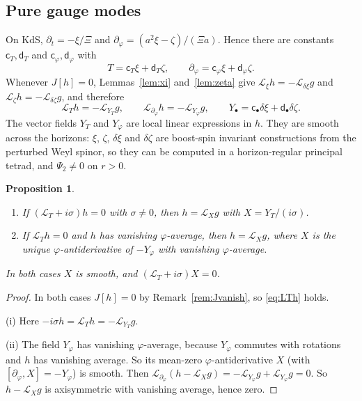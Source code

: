 \documentclass[11pt]{amsart}
\newtheorem{proposition}[theorem]{Proposition}
\theoremstyle{definition}
\theoremstyle{remark}
\numberwithin{equation}{section}
\newcommand{\cL}{\mathcal{L}}
\begin{document}
\subsection{Pure gauge modes}
On KdS, $\partial_t=-\xi/\Xi$ and $\partial_\varphi=(a^2\xi-\zeta)/(\Xi a)$. Hence there are constants $\mathsf c_T,\mathsf d_T$
and $\mathsf c_\varphi,\mathsf d_\varphi$ with
\[
T=\mathsf c_T\xi+\mathsf d_T\zeta,\qquad \partial_\varphi=\mathsf c_\varphi\xi+\mathsf d_\varphi\zeta.
\]
Whenever $J[h]=0$, Lemmas~\ref{lem:xi} and~\ref{lem:zeta} give $\cL_\xi h=-\cL_{\delta\xi}g$ and
$\cL_\zeta h=-\cL_{\delta\zeta}g$, and therefore
\begin{equation}\label{eq:LTh}
\cL_Th=-\cL_{Y_T}g,\qquad \cL_{\partial_\varphi}h=-\cL_{Y_\varphi}g,\qquad
Y_\bullet=\mathsf c_\bullet\delta\xi+\mathsf d_\bullet\delta\zeta.
\end{equation}
The vector fields $Y_T$ and $Y_\varphi$ are local linear expressions in $h$. They are smooth across the horizons:
$\xi$, $\zeta$, $\delta\xi$ and $\delta\zeta$ are boost-spin invariant constructions from the perturbed Weyl spinor,
so they can be computed in a horizon-regular principal tetrad, and $\Psi_2\ne0$ on $r>0$.

\begin{proposition}\label{prop:puregauge}
\begin{enumerate}[label=(\roman*)]
\item If $(\cL_T+i\sigma)h=0$ with $\sigma\ne0$, then $h=\cL_Xg$ with $X=Y_T/(i\sigma)$.
\item If $\cL_Th=0$ and $h$ has vanishing $\varphi$-average, then $h=\cL_Xg$, where $X$ is the unique
$\varphi$-antiderivative of $-Y_\varphi$ with vanishing $\varphi$-average.
\end{enumerate}
In both cases $X$ is smooth, and $(\cL_T+i\sigma)X=0$.
\end{proposition}

\begin{proof}
In both cases $J[h]=0$ by Remark~\ref{rem:Jvanish}, so \eqref{eq:LTh} holds.

(i) Here $-i\sigma h=\cL_Th=-\cL_{Y_T}g$.

(ii) The field $Y_\varphi$ has vanishing $\varphi$-average, because $Y_\varphi$ commutes with rotations and $h$ has
vanishing average. So its mean-zero $\varphi$-antiderivative $X$ (with $[\partial_\varphi,X]=-Y_\varphi$) is smooth.
Then $\cL_{\partial_\varphi}(h-\cL_Xg)=-\cL_{Y_\varphi}g+\cL_{Y_\varphi}g=0$. So $h-\cL_Xg$ is axisymmetric with
vanishing average, hence zero.
\end{proof}
\end{document}
